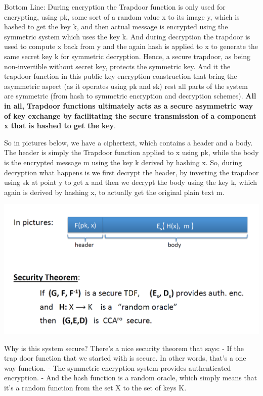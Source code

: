\documentclass[11pt]{article}
\makeatletter
\def\maxwidth{\ifdim\Gin@nat@width>\linewidth\linewidth
    \else\Gin@nat@width\fi}
\let\Oldincludegraphics\includegraphics
\renewcommand{\includegraphics}[1]{\Oldincludegraphics[width=.8\maxwidth]{#1}}
\makeatother
\begin{document}
Bottom Line: During encryption the Trapdoor function is only used for
encrypting, using pk, some sort of a random value x to its image y,
which is hashed to get the key k, and then actual message is encrypted
using the symmetric system which uses the key k. And during decryption
the trapdoor is used to compute x back from y and the again hash is
applied to x to generate the same secret key k for symmetric decryption.
Hence, a secure trapdoor, as being non-invertible without secret key,
protects the symmetric key. And it the trapdoor function in this public
key encryption construction that bring the asymmetric aspect (as it
operates using pk and sk) rest all parts of the system are symmetric
(from hash to symmetric encryption and decryption schemes). \textbf{All
in all, Trapdoor functions ultimately acts as a secure asymmetric way of
key exchange by facilitating the secure transmission of a component x
that is hashed to get the key}.

So in pictures below, we have a ciphertext, which contains a header and
a body. The header is simply the Trapdoor function applied to x using
pk, while the body is the encrypted message m using the key k derived by
hashing x. So, during decryption what happens is we first decrypt the
header, by inverting the trapdoor using sk at point y to get x and then
we decrypt the body using the key k, which again is derived by hashing
x, to actually get the original plain text m.

\includegraphics{./Images/PKEncFromTDFSecurity.png}

Why is this system secure? There's a nice security theorem that says: -
If the trap door function that we started with is secure. In other
words, that's a one way function. - The symmetric encryption system
provides authenticated encryption. - And the hash function is a random
oracle, which simply means that it's a random function from the set X to
the set of keys K.
\end{document}

